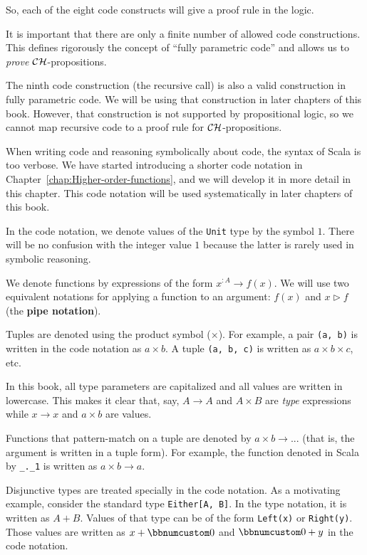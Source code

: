 So, each of the eight code constructs will give a proof rule in the
logic.

It is important that there are only a finite number of allowed code
constructions. This defines rigorously the concept of \textsf{``}fully parametric
code\textsf{''} and allows us to \emph{prove}
${\cal CH}$-propositions.

The ninth code construction (the recursive call) is also a valid construction
in fully parametric code. We will be using that construction in later
chapters of this book. However, that construction is not supported
by propositional logic, so we cannot map recursive code to a proof
rule for ${\cal CH}$-propositions.

When writing code and reasoning symbolically about code, the syntax
of Scala is too verbose. We have started introducing a shorter code
notation in Chapter~\ref{chap:Higher-order-functions}, and we will
develop it in more detail in this chapter. This code notation will
be used systematically in later chapters of this book. 

In the code notation, we denote values of the \lstinline!Unit! type
by the symbol $1$. There will be no confusion with the integer value
$1$ because the latter is rarely used in symbolic reasoning.

We denote functions by expressions of the form $x^{:A}\rightarrow f(x)$.
We will use two equivalent notations for applying a function to an
argument: $f(x)$ and $x\triangleright f$ (the \textbf{pipe
notation}).

Tuples are denoted using the product symbol ($\times$). For example,
a pair \lstinline!(a, b)! is written in the code notation as $a\times b$.
A tuple \lstinline!(a, b, c)! is written as $a\times b\times c$,
etc.

In this book, all type parameters are capitalized and all values are
written in lowercase. This makes it clear that, say, $A\rightarrow A$
and $A\times B$ are \emph{type} expressions while $x\rightarrow x$
and $a\times b$ are values.

Functions that pattern-match on a tuple are denoted by $a\times b\rightarrow...$
(that is, the argument is written in a tuple form). For example, the
function denoted in Scala by \lstinline!_._1! is written as $a\times b\rightarrow a$.

Disjunctive types are treated specially in the code notation. As a
motivating example, consider the standard type \lstinline!Either[A, B]!.
In the type notation, it is written as $A+B$. Values of that type
can be of the form \lstinline!Left(x)! or \lstinline!Right(y)!.
Those values are written as $x+\bbnum 0$ and $\bbnum 0+y$ in the
code notation. 

